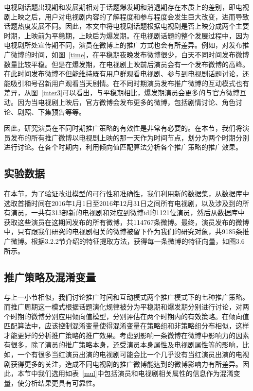 电视剧话题出现期和发展期相对于话题爆发期和消退期存在本质上的差别，即电视剧上映之后，用户对电视剧内容的了解程度和参与程度会发生巨大改变，进而导致话题热度发展不同。因此，本文中将电视剧话题根据电视剧是否上映分成两个主要时期，上映前为平稳期，上映后为爆发期。在电视剧话题的整个发展过程中，因为电视剧所处宣传期不同，演员在微博上的推广方式也会有所差异。例如，对发布推广微博的时间，如图~\ref{time}，在平稳期夜晚发布微博很少，白天不同时间发布微博数量比较平稳。但是在爆发期，在电视剧上映前后演员会有一个发布微博的高峰。在此时间发布微博不但能维持既有用户群观看电视剧、参与到电视剧话题讨论，还能吸引和号召新用户观看当天剧情。在不同时期演员发布推广微博的互动模式也有差异，从图~\ref{inter3}可以看出，与平稳期相比，爆发期演员会更多的与官方微博互动。因为当电视剧上映后，官方微博会发布更多的微博，包括剧情讨论、角色讨论、剧照、下集预告等等。

因此，研究演员在不同时期推广策略的有效性是非常有必要的。在本节，我们将演员发布的所有推广微博以电视剧上映的那一天作为时间节点，划分为两个时期分别进行讨论。在各个时期内，利用倾向值匹配算法分析各个推广策略的推广效果。

\subsection{实验数据}

在本节，为了验证改进模型的可行性和准确性，我们利用新的数据集，从数据库中选取首播时间在2016年1月1日至2016年12月31日之间所有电视剧，以及涉及到的所有演员，一共有313部新的电视剧和对应到微博id的1121位演员，然后从数据库中获取这些演员在这期间发布的所有微博，共114767条微博。最终，演员发布的微博中，只有跟我们研究的电视剧相关的微博被留下作为我们的研究对象，共9185条推广微博。根据3.2.2节介绍的特征提取方法，获得每一条微博的特征向量，如图3.6所示。

\subsection{推广策略及混淆变量}

与上一小节相似，我们讨论推广时间和互动模式两个推广模式下的七种推广策略。而推广周期这一模式根据话题演化规律被分为平稳期和爆发期分别进行讨论，对两个时期的微博分别应用倾向值模型，分别评估在两个时期内的有效策略。在倾向值匹配算法中，应该控制混淆变量使得混淆变量在策略组和非策略组分布相似，这样才能更好的分析推广策略的推广效果。考虑到影响一条微博在微博中影响力的因素有很多，除了演员的推广策略本身，还受演员本身属性及电视剧属性等的影响，比如，一个有很多当红演员出演的电视剧可能会比一个几乎没有当红演员出演的电视剧获得更多的关注，造成不同电视剧的推广微博能达到的微博影响力有所差异。因此，本节中我们选用如表~\ref{mul}中包括演员和电视剧相关属性的信息作为混淆变量，使分析结果更具有可靠性。

